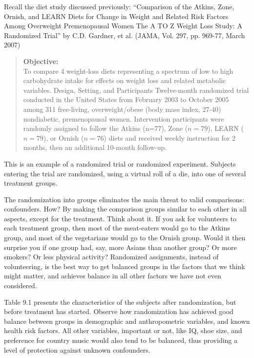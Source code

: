 \documentclass[11pt, chapterprefix=true]{scrbook}\usepackage[]{graphicx}\usepackage[]{color}
\begin{document}
Recall the diet study discussed previously: ``Comparison of the Atkins, Zone, Ornish, and LEARN Diets for Change in Weight and Related Risk Factors Among Overweight Premenopausal Women The A TO Z Weight Loss Study: A Randomized Trial'' by C.D. Gardner, et al. (JAMA, Vol. 297, pp. 969-77, March 2007)

\begin{quotation}
 \textbf{Objective:} \\ To compare 4 weight-loss diets representing a spectrum of low to high carbohydrate intake for effects on weight loss and related metabolic variables. Design, Setting, and Participants Twelve-month randomized trial conducted in the United States from February 2003 to October 2005 among 311 free-living, overweight/obese (body mass index, 27-40) nondiabetic, premenopausal women.  Intervention participants were randomly assigned to follow the Atkins (n=77), Zone ($n = 79$), LEARN ($n = 79$), or Ornish ($n = 76$) diets and received weekly instruction for 2 months, then an additional 10-month follow-up.
\end{quotation}

This is an example of a randomized trial or randomized experiment.   Subjects entering the trial are randomized, using a virtual roll of a die, into one of several treatment groups.

The randomization into groups eliminates the main threat to valid comparisons: confounders.  How?  By making the comparison groups similar to each other in all aspects, except for the treatment.  Think about it.  If you ask for volunteers to each treatment group, then most of the meat-eaters would go to the Atkins group, and most of the vegetarians would go to the Ornish group.   Would it then surprise you if one group had, say, more Asians than another group?  Or more smokers?  Or less physical activity?  Randomized assignments, instead of volunteering, is the best way to get balanced groups in the factors that we think might matter, and achieves balance in all other factors we have not even considered.

Table 9.1 presents the characteristics of the subjects after randomization, but before treatment has started.  Observe how randomization has achieved good balance between groups in demographic and anthropometric variables, and known health risk factors.  All other variables, important or not, like IQ, shoe size, and preference for country music would also tend to be balanced, thus providing a level of protection against unknown confounders.
\end{document}
